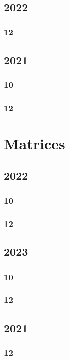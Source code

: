 \documentclass[11pt]{book}
\begin{document}
\section{2022}
\subsection{12}

\section{2021}
\subsection{10}

\subsection{12}

\chapter{Matrices}
\section{2022}
\subsection{10}

\subsection{12}

\section{2023}
\subsection{10}

\subsection{12}

\section{2021}
\subsection{12}

\end{document}
